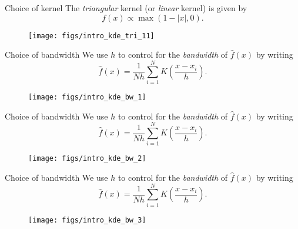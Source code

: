 \documentclass[11pt, aspectratio=149]{beamer}
\theoremstyle{plain}
\begin{document}
\begin{frame}[fragile, t]{Choice of kernel}
	The \emph{triangular} kernel (or \emph{linear} kernel) is given by
	\begin{equation*}
	f(x) \propto \max(1 - |x|, 0).
	\end{equation*}
	\vfill
	\begin{figure}
		\centering
		\texttt{[image: figs/intro\_kde\_tri\_11]}
	\end{figure}
\end{frame}





\begin{frame}[fragile, t]{Choice of bandwidth}
	We use $h$ to control for the \emph{bandwidth} of $\hat{f}(x)$ by writing
	\begin{equation*}
	\hat{f}(x) = \frac{1}{Nh} \sum_{i=1}^{N} K\left(\frac{x - x_i}{h}\right).
	\end{equation*}
	\vfill
	\begin{figure}
		\centering
		\texttt{[image: figs/intro\_kde\_bw\_1]}
	\end{figure}
\end{frame}


\begin{frame}[fragile, t]{Choice of bandwidth}
	We use $h$ to control for the \emph{bandwidth} of $\hat{f}(x)$ by writing
	\begin{equation*}
	\hat{f}(x) = \frac{1}{Nh} \sum_{i=1}^{N} K\left(\frac{x - x_i}{h}\right).
	\end{equation*}
	\vfill
	\begin{figure}
		\centering
		\texttt{[image: figs/intro\_kde\_bw\_2]}
	\end{figure}
\end{frame}


\begin{frame}[fragile, t]{Choice of bandwidth}
	We use $h$ to control for the \emph{bandwidth} of $\hat{f}(x)$ by writing
	\begin{equation*}
	\hat{f}(x) = \frac{1}{Nh} \sum_{i=1}^{N} K\left(\frac{x - x_i}{h}\right).
	\end{equation*}
	\vfill
	\begin{figure}
		\centering
		\texttt{[image: figs/intro\_kde\_bw\_3]}
	\end{figure}
\end{frame}
\end{document}
